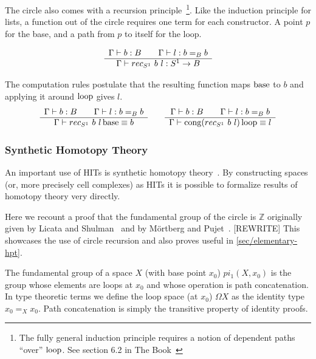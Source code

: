 The circle also comes with a recursion principle~\footnote{The fully general
  induction principle requires a notion of dependent paths ``over'' $\operatorname{loop}$. See section 6.2 in
  The Book~\cite{hottbook}}. Like the induction principle for lists,
a function out of the circle requires one term for each constructor. A point $p$
for the base, and a path from $p$ to itself for the loop.

\begin{equation*}
  \begin{array}[t]{c}
    \Gamma \vdash b : B \qquad \Gamma \vdash l : b =_B b\\
    \hline
    \Gamma \vdash rec_{S^1}~b~l : S^1 \rightarrow B
  \end{array}
\end{equation*}

The computation rules postulate that the resulting function maps $\operatorname{base}$ to $b$
and applying it around $\operatorname{loop}$ gives $l$.
\begin{equation*}
  \begin{array}[t]{c}
    \Gamma \vdash b : B \qquad \Gamma \vdash l : b =_B b\\
    \hline
    \Gamma \vdash rec_{S^1}~b~l \operatorname{base} \equiv b
  \end{array}
  \qquad
  \begin{array}[t]{c}
    \Gamma \vdash b : B \qquad \Gamma \vdash l : b =_B b\\
    \hline
    \Gamma \vdash \operatorname{cong} (rec_{S^1}~b~l) \operatorname{loop} \equiv l
  \end{array}
\end{equation*}

\subsubsection{Synthetic Homotopy Theory}

An important use of HITs is synthetic homotopy theory~\cite{mortberg2020cubical,
  licata2015cubical}. By constructing spaces (or, more precisely cell
complexes) as HITs it is possible to formalize results of homotopy theory very
directly.

Here we recount a proof that the fundamental group of the circle is $\mathbb{Z}$
originally given by Licata and Shulman~\cite{licata2013circle} and by M\"ortberg
and Pujet~\cite{mortberg2020cubical}. [REWRITE] This showcases the use of circle
recursion and also proves useful in \autoref{sec/elementary-hpt}.

The fundamental group of a space $X$ (with base point $x_0$) $pi_1(X, x_0)$ is
the group whose elements are loops at $x_0$ and whose operation is path
concatenation. In type theoretic terms we define the loop space (at $x_0$) $\Omega X$ as the
identity type $x_0 =_X x_0$. Path concatenation is simply the transitive
property of identity proofs.

